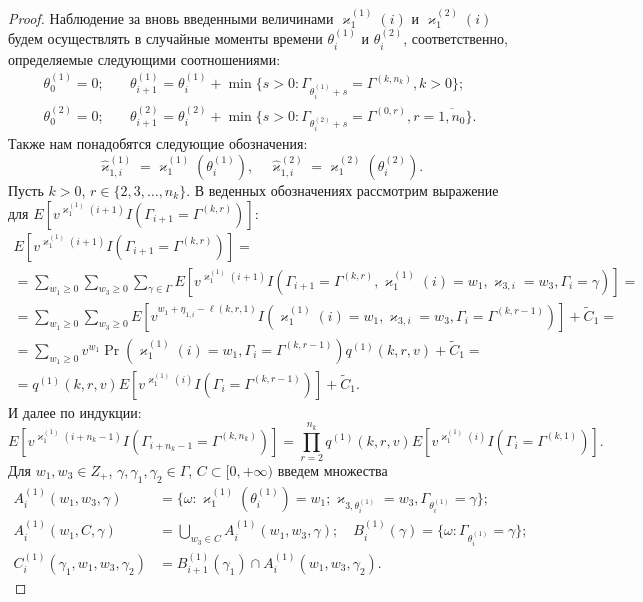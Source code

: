 \documentclass[a4paper,12pt,russian]{extarticle}
\begin{document}
\begin{proof}
Наблюдение за вновь введенными величинами $\varkappa_{1}^{(1)}(i)$ и $\varkappa_{1}^{(2)}(i)$ будем осуществлять в случайные моменты времени $\theta_{i}^{(1)}$ и $\theta_{i}^{(2)}$, соответственно, определяемые следующими соотношениями:
\begin{equation}
\begin{aligned}
  \theta_{0}^{(1)}=0; & \quad \theta_{i+1}^{(1)}=\theta_{i}^{(1)} + \min{\{s>0\colon \Gamma_{\theta_{i}^{(1)}+s} = \Gamma^{(k,n_k)}, k>0\}};\\
  \theta_{0}^{(2)}=0; & \quad  \theta_{i+1}^{(2)}=\theta_{i}^{(2)} + \min{\{s>0\colon \Gamma_{\theta_{i}^{(2)}+s} = \Gamma^{(0,r)}, r=\overline{1,n_0}\}}.
  \label{stop:times}
\end{aligned}
\end{equation}
Также нам понадобятся следующие обозначения:
\begin{equation}
  \hat{\varkappa}_{1,i}^{(1)}=\varkappa_{1}^{(1)}(\theta_{i}^{(1)}), \quad   \hat{\varkappa}_{1,i}^{(2)}=\varkappa_{1}^{(2)}(\theta_{i}^{(2)}).
  \label{stop:queue}
\end{equation}
Пусть $k>0$, $r \in \{2, 3, \ldots, n_k\}$. В веденных обозначениях рассмотрим выражение для $E[v^{\varkappa_{1}^{(1)}(i+1)} I(\Gamma_{i+1}=\Gamma^{(k,r)})]$:
\begin{multline*}
  E[v^{\varkappa_{1}^{(1)}(i+1)} I(\Gamma_{i+1}=\Gamma^{(k,r)})] = \\ =\sum_{w_1 \geqslant 0} \sum_{w_3 \geqslant 0} \sum_{\gamma \in \Gamma} E[v^{\varkappa_{1}^{(1)}(i+1)} I(\Gamma_{i+1}=\Gamma^{(k,r)}, \varkappa_{1}^{(1)}(i)=w_1, \varkappa_{3,i}=w_3,\Gamma_i=\gamma)] =\\= \sum_{w_1\geqslant 0} \sum_{w_3\geqslant 0} E[v^{w_1 + \eta_{1,i}-\ell(k,r,1)} I(\varkappa_{1}^{(1)}(i)=w_1, \varkappa_{3,i}=w_3,\Gamma_i=\Gamma^{(k,r-1)})] + \widetilde{C}_1=\\
  =\sum_{w_1\geqslant 0} v^{w_1 } \Pr (\varkappa_{1}^{(1)}(i)=w_1, \Gamma_i=\Gamma^{(k,r-1)}) q^{(1)}(k,r,v) + \widetilde{C}_1 = \\
  =q^{(1)}(k,r,v) E[v^{\varkappa_{1}^{(1)}(i)} I(\Gamma_i=\Gamma^{(k,r-1)})] + \widetilde{C}_1.
\end{multline*}
И далее по индукции:
\begin{equation*}
  E[v^{\varkappa_{1}^{(1)}(i+n_k-1)} I(\Gamma_{i+n_k-1}=\Gamma^{(k,n_k)})] = \prod_{r=2}^{n_k} q^{(1)}(k,r,v) E[v^{\varkappa_{1}^{(1)}(i)} I(\Gamma_{i}=\Gamma^{(k,1)})].
\end{equation*}
Для $w_1, w_3 \in Z_+$, $\gamma, \gamma_1, \gamma_2 \in \Gamma$, $C \subset [0, +\infty)$ введем множества 
\begin{align*}
  A_i^{(1)}(w_1,w_3,\gamma) &= \{\omega\colon \varkappa_{1}^{(1)}(\theta_{i}^{(1)})=w_1; \varkappa_{3,\theta_{i}^{(1)}}=w_3, \Gamma_{\theta_{i}^{(1)}}=\gamma\};\\
  A_i^{(1)}(w_1,C,\gamma) &= \bigcup_{w_3 \in C} A_i^{(1)}(w_1,w_3,\gamma);\quad B_i^{(1)}(\gamma) =\{\omega\colon \Gamma_{\theta_{i}^{(1)}}=\gamma\};\\
  C_i^{(1)}(\gamma_1,w_1,w_3,\gamma_2)&= B_{i+1}^{(1)}(\gamma_1) \cap A_i^{(1)}(w_1,w_3,\gamma_2) .
\end{align*}


\end{proof}
\end{document}
